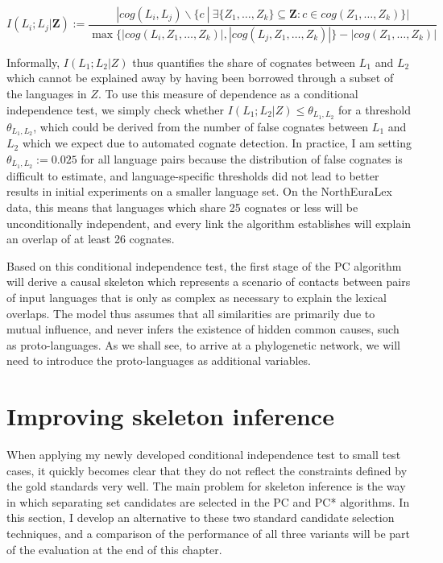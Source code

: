 \begin{equation*}
 I(L_i;L_j|\mathbf{Z}) := \frac{|cog(L_i,L_j)\backslash\{c\ |\ \exists \{Z_1,\dots,Z_k\} \subseteq \mathbf{Z}\colon c \in cog(Z_1,\dots,Z_k)\}|}{\max\{|cog(L_i,Z_1,\dots,Z_k)|,|cog(L_j,Z_1,\dots,Z_k)|\}-|cog(Z_1,\dots,Z_k)|} 
\end{equation*}

Informally, $I(L_1;L_2|Z)$ thus quantifies the share of cognates between $L_1$ and $L_2$ which cannot be explained away by having been borrowed through a subset of the languages in $Z$. To use this measure of dependence as a conditional independence test, we simply check whether $I(L_1;L_2|Z) \leq \theta_{L_1,L_2}$ for a threshold $\theta_{L_1,L_2}$, which could be derived from the number of false cognates between $L_1$ and $L_2$ which we expect due to automated cognate detection. In practice, I am setting $\theta_{L_1,L_2} := 0.025$ for all language pairs because the distribution of false cognates is difficult to estimate, and language-specific thresholds did not lead to better results in initial experiments on a smaller language set. On the NorthEuraLex data, this means that languages which share 25 cognates or less will be unconditionally independent, and every link the algorithm establishes will explain an overlap of at least 26 cognates.

Based on this conditional independence test, the first stage of the PC algorithm will derive a causal skeleton which represents a scenario of contacts between pairs of input languages that is only as complex as necessary to explain the lexical overlaps. The model thus assumes that all similarities are primarily due to mutual influence, and never infers the existence of hidden common causes, such as proto-languages. As we shall see, to arrive at a phylogenetic network, we will need to introduce the proto-languages as additional variables.

\section{Improving skeleton inference}\label{sec:6.4}
When applying my newly developed conditional independence test to small test cases, it quickly becomes clear that they do not reflect the constraints defined by the gold standards very well. The main problem for skeleton inference is the way in which separating set candidates are selected in the PC and PC* algorithms. In this section, I develop an alternative to these two standard candidate selection techniques, and a comparison of the performance of all three variants will be part of the evaluation at the end of this chapter.

